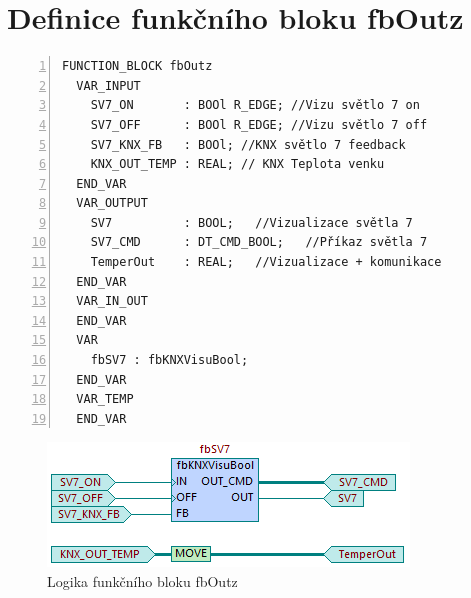 \chapter{Definice funkčního bloku fbOutz}
\label{apend:fbOutz}
\begin{lstlisting}[language=ST, breaklines=true, numbers=left, numberstyle=\small, numbersep=10pt, frame=single, basicstyle=\ttfamily\small, caption={Definice funkčního bloku fbOutz}, label={lst:fbOutz}]
  FUNCTION_BLOCK fbOutz
  VAR_INPUT
    SV7_ON       : BOOl R_EDGE; //Vizu světlo 7 on
    SV7_OFF      : BOOl R_EDGE; //Vizu světlo 7 off
    SV7_KNX_FB   : BOOl; //KNX světlo 7 feedback
    KNX_OUT_TEMP : REAL; // KNX Teplota venku
  END_VAR
  VAR_OUTPUT
    SV7          : BOOL;   //Vizualizace světla 7
    SV7_CMD      : DT_CMD_BOOL;   //Příkaz světla 7
    TemperOut    : REAL;   //Vizualizace + komunikace
  END_VAR
  VAR_IN_OUT
  END_VAR
  VAR
    fbSV7 : fbKNXVisuBool;
  END_VAR
  VAR_TEMP
  END_VAR
\end{lstlisting}
\begin{figure}[!ht]
  \begin{center}
  \includegraphics[scale=1.3]{obrazky/fbOutz.png}
  \end{center}
  \caption[Logika funkčního bloku fbOutz]{Logika funkčního bloku fbOutz}
  \label{fig:fbOutz}
\end{figure}
\pagebreak
